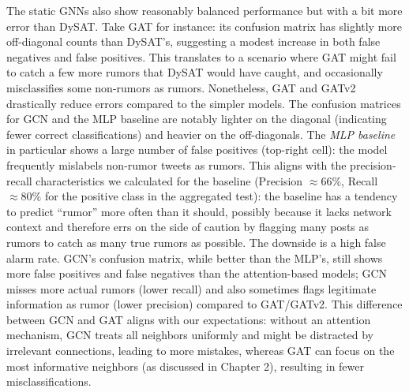 \documentclass{cshonours}
\begin{document}
The static GNNs also show reasonably balanced performance but with a bit more error than DySAT. Take GAT for instance: its confusion matrix has slightly more off-diagonal counts than DySAT's, suggesting a modest increase in both false negatives and false positives. This translates to a scenario where GAT might fail to catch a few more rumors that DySAT would have caught, and occasionally misclassifies some non-rumors as rumors. Nonetheless, GAT and GATv2 drastically reduce errors compared to the simpler models. The confusion matrices for GCN and the MLP baseline are notably lighter on the diagonal (indicating fewer correct classifications) and heavier on the off-diagonals. The \emph{MLP baseline} in particular shows a large number of false positives (top-right cell): the model frequently mislabels non-rumor tweets as rumors. This aligns with the precision-recall characteristics we calculated for the baseline (Precision $\approx 66\%$, Recall $\approx 80\%$ for the positive class in the aggregated test): the baseline has a tendency to predict ``rumor'' more often than it should, possibly because it lacks network context and therefore errs on the side of caution by flagging many posts as rumors to catch as many true rumors as possible. The downside is a high false alarm rate. GCN's confusion matrix, while better than the MLP's, still shows more false positives and false negatives than the attention-based models; GCN misses more actual rumors (lower recall) and also sometimes flags legitimate information as rumor (lower precision) compared to GAT/GATv2. This difference between GCN and GAT aligns with our expectations: without an attention mechanism, GCN treats all neighbors uniformly and might be distracted by irrelevant connections, leading to more mistakes, whereas GAT can focus on the most informative neighbors (as discussed in Chapter 2), resulting in fewer misclassifications.
\end{document}
